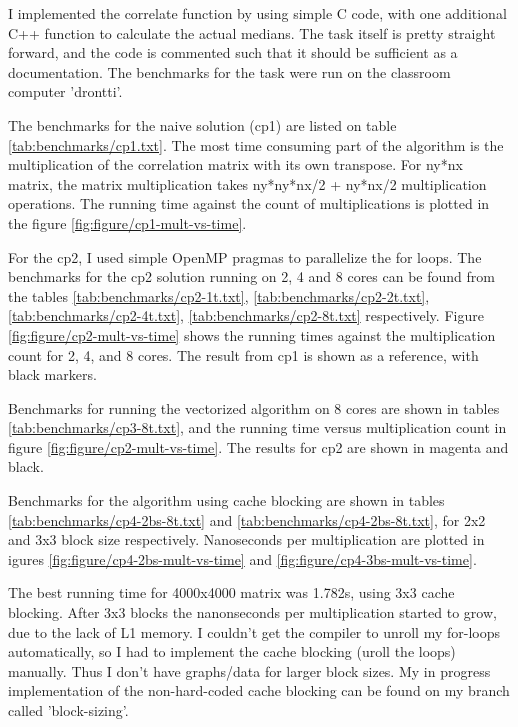I implemented the correlate function by using simple C code, with one additional C++ function to calculate the actual medians. The task itself is pretty straight forward, and the code is commented such that it should be sufficient as a documentation. The benchmarks for the task were run on the classroom computer 'drontti'.

The benchmarks for the naive solution (cp1) are listed on table \ref{tab:benchmarks/cp1.txt}. The most time consuming part of the algorithm is the multiplication of the correlation matrix with its own transpose. For ny*nx matrix, the matrix multiplication takes ny*ny*nx/2 + ny*nx/2 multiplication operations. The running time against the count of multiplications is plotted in the figure \ref{fig:figure/cp1-mult-vs-time}.

For the cp2, I used simple OpenMP pragmas to parallelize the for loops. The benchmarks for the cp2 solution running on 2, 4 and 8 cores can be found from the tables \ref{tab:benchmarks/cp2-1t.txt}, \ref{tab:benchmarks/cp2-2t.txt}, \ref{tab:benchmarks/cp2-4t.txt}, \ref{tab:benchmarks/cp2-8t.txt} respectively. Figure  \ref{fig:figure/cp2-mult-vs-time} shows the running times against the multiplication count for 2, 4, and 8 cores. The result from cp1 is shown as a reference, with black markers.

Benchmarks for running the vectorized algorithm on 8 cores are shown in tables \ref{tab:benchmarks/cp3-8t.txt}, and the running time versus multiplication count in figure \ref{fig:figure/cp2-mult-vs-time}. The results for cp2 are shown in magenta and black.

Benchmarks for the algorithm using cache blocking are shown in tables \ref{tab:benchmarks/cp4-2bs-8t.txt} and \ref{tab:benchmarks/cp4-2bs-8t.txt}, for 2x2 and 3x3 block size respectively. Nanoseconds per multiplication are plotted in igures \ref{fig:figure/cp4-2bs-mult-vs-time} and \ref{fig:figure/cp4-3bs-mult-vs-time}.

The best running time for 4000x4000 matrix was 1.782s, using 3x3 cache blocking. After 3x3 blocks the nanonseconds per multiplication started to grow, due to the lack of L1 memory. I couldn't get the compiler to unroll my for-loops automatically, so I had to implement the cache blocking (uroll the loops) manually. Thus I don't have graphs/data for larger block sizes. My in progress implementation of the non-hard-coded cache blocking can be found on my branch called 'block-sizing'.


